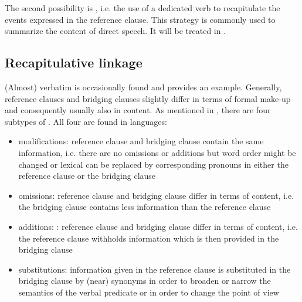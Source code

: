\documentclass[output=paper]{LSP/langsci}
\begin{document}
The second possibility is , i.e. the use of a dedicated verb to recapitulate the events expressed in the reference clause. This strategy is commonly used to summarize the content of direct speech. It will be treated in .



\subsection{Recapitulative linkage}
\label{ssec:Recapitulative linkage}
(Almost) verbatim  is occasionally found and  provides an example. Generally, reference clauses and bridging clauses slightly differ in terms of formal make-up and consequently usually also in content. As mentioned in , there are four subtypes of . All four are found in  languages:

\begin{itemize}  
\item modifications: reference clause and bridging clause contain the same information, i.e. there are no omissions or additions but word order might be changed or lexical  can be replaced by corresponding pronouns in either the reference clause or the bridging clause
\item omissions: reference clause and bridging clause differ in terms of content, i.e. the bridging clause contains less information than the reference clause
\item	additions: : reference clause and bridging clause differ in terms of content, i.e. the reference clause withholds information which is then provided in the bridging clause
\item substitutions: information given in the reference clause is substituted in the bridging clause by (near) synonyms in order to broaden or narrow the semantics of the verbal predicate or in order to change the point of view  
\end{itemize}
\end{document}
